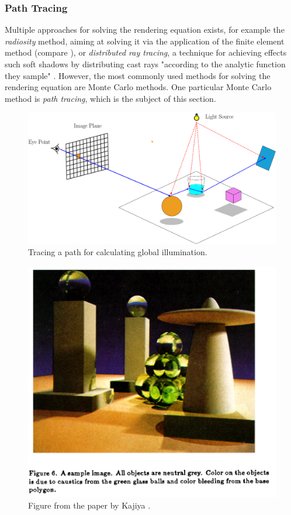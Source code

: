\subsubsection{Path Tracing}

Multiple approaches for solving the rendering equation exists, for example the \emph{radiosity} method, aiming at solving it via the application of the finite element method (compare \cite{goral1984modeling}), or \emph{distributed ray tracing}, a technique for achieving effects such soft shadows by distributing cast rays "according to the analytic function they sample" \cite{cook1984distributed}.  However, the most commonly used methods for solving the rendering equation are Monte Carlo methods.  One particular Monte Carlo method is \emph{path tracing}, which is the subject of this section.

\begin{figure}
	\centering
	\includegraphics[width=1\linewidth]{img/1 fundamentals/path_tracing.png}
	\caption{Tracing a path for calculating global illumination.}
	\label{fig:pathtracing}
\end{figure}

\begin{figure}
	\centering
	\includegraphics[width=.7\linewidth]{img/1 fundamentals/rendering_eq_figure.png}
	\caption{Figure from the paper  by Kajiya \cite{kajiya1986rendering}.}
	\label{fig:kajiya_figure}
\end{figure}

